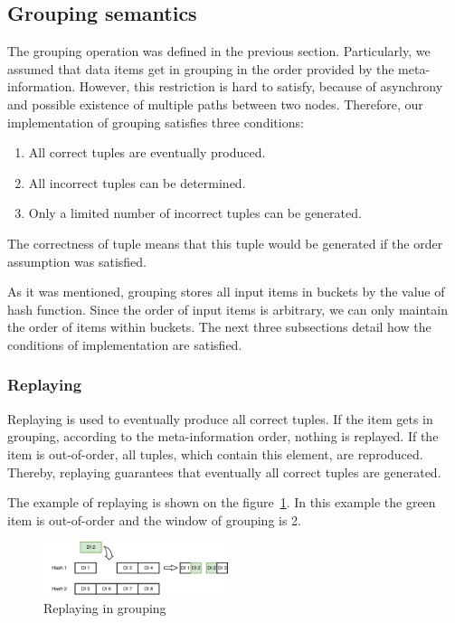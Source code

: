 
\label  {fs-implementation-section}

\subsection{Grouping semantics}
The grouping operation was defined in the previous section. Particularly, we assumed that data items get in grouping in the order provided by the meta-information. However, this restriction is hard to satisfy, because of asynchrony and possible existence of multiple paths between two nodes. Therefore, our implementation of grouping satisfies three conditions:

\begin{enumerate}
\item All correct tuples are eventually produced.
\item All incorrect tuples can be determined.
\item Only a limited number of incorrect tuples can be generated.
\end{enumerate}

The correctness of tuple means that this tuple would be generated if the order assumption was satisfied. 

As it was mentioned, grouping stores all input items in buckets by the value of hash function. Since the order of input items is arbitrary, we can only maintain the order of items within buckets. The next three subsections detail how the conditions of implementation are satisfied.

\subsubsection{Replaying}

Replaying is used to eventually produce all correct tuples. If the item gets in grouping, according to the meta-information order, nothing is replayed. If the item is out-of-order, all tuples, which contain this element, are reproduced. Thereby, replaying guarantees that eventually all correct tuples are generated.

The example of replaying is shown on the figure~\ref{grouping-replaying-figure}. In this example the green item is out-of-order and the window of grouping is 2.

\begin{figure}[htbp]
  \centering
  \includegraphics[width=0.48\textwidth]{pics/grouping-replaying}
  \caption{Replaying in grouping}
  \label {grouping-replaying-figure}
\end{figure}

